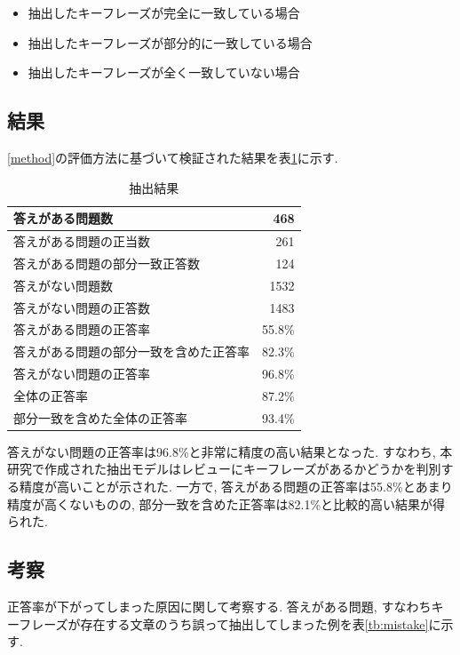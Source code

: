 \begin{itemize}
  \item 抽出したキーフレーズが完全に一致している場合
  \item 抽出したキーフレーズが部分的に一致している場合
  \item 抽出したキーフレーズが全く一致していない場合
\end{itemize}

\subsection{結果}
\ref{method}の評価方法に基づいて検証された結果を表\ref{tb:qa}に示す. 

\begin{table}[H]
  \caption{抽出結果}
  \small
  \label{tb:qa}
  \begin{center}
  \begin{tabularx}{\linewidth}{X|r}
    \hline
    答えがある問題数&468\\\hline
    答えがある問題の正当数&261\\\hline
    答えがある問題の部分一致正答数&124\\\hline
    答えがない問題数&1532\\\hline
    答えがない問題の正答数&1483\\\hline\hline
    答えがある問題の正答率&55.8\%\\\hline
    答えがある問題の部分一致を含めた正答率&82.3\%\\\hline
    答えがない問題の正答率&96.8\%\\\hline\hline
    全体の正答率&87.2\%\\\hline
    部分一致を含めた全体の正答率&93.4\%\\\hline
  \end{tabularx}\end{center}
\end{table}

答えがない問題の正答率は96.8\%と非常に精度の高い結果となった. すなわち, 本研究で作成された抽出モデルはレビューにキーフレーズがあるかどうかを判別する精度が高いことが示された. 
一方で, 答えがある問題の正答率は55.8\%とあまり精度が高くないものの, 部分一致を含めた正答率は82.1\%と比較的高い結果が得られた. 

\subsection{考察}
正答率が下がってしまった原因に関して考察する. 
答えがある問題, すなわちキーフレーズが存在する文章のうち誤って抽出してしまった例を表\ref{tb:mistake}に示す.

